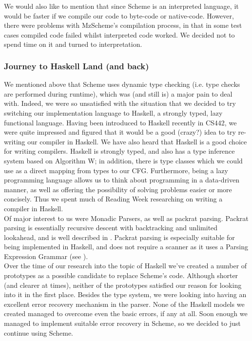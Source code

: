 \documentclass[onecolumn,11pt]{article}
\begin{document}
We would also like to mention that since Scheme is an interpreted language, it would be faster if we compile our code to byte-code or native-code. However, there were problems with MzScheme's compilation process, in that in some test cases compiled code failed whilst interpreted code worked. We decided not to spend time on it and turned to interpretation.

\subsubsection{Journey to Haskell Land (and back)}
We mentioned above that Scheme uses dynamic type checking (i.e. type checks are performed during runtime), which was (and still is) a major pain to deal with. Indeed, we were so unsatisfied with the situation that we decided to try switching our implementation language to Haskell, a strongly typed, lazy functional language. Having been introduced to Haskell recently in CS442, we were quite impressed and figured that it would be a good (crazy?) idea to try re-writing our compiler in Haskell. We have also heard that Haskell is a good choice for writing compilers. Haskell is strongly typed, and also has a type inference system based on Algorithm W; in addition, there is type classes which we could use as a direct mapping from types to our CFG. Furthermore, being a lazy programming language allows us to think about programming in a data-driven manner, as well as offering the possibility of solving problems easier or more concisely. Thus we spent much of Reading Week researching on writing a compiler in Haskell. \\

Of major interest to us were Monadic Parsers, as well as packrat parsing. Packrat parsing is essentially recursive descent with backtracking and unlimited lookahead, and is well described in \cite{ford02}. Packrat parsing is especially suitable for being implemented in Haskell, and does not require a scanner as it uses a Parsing Expression Grammar (see \cite{ford04}). \\

Over the time of our research into the topic of Haskell we've created a number of prototypes as a possible candidate to replace Scheme's code. Although shorter (and clearer at times), neither of the prototypes satisfied our reason for looking into it in the first place. Besides the type system, we were looking into having an excellent error recovery mechanism in the parser. None of the Haskell models we created managed to overcome even the basic errors, if any at all. Soon enough we managed to implement suitable error recovery in Scheme, so we decided to just continue using Scheme.
\end{document}
